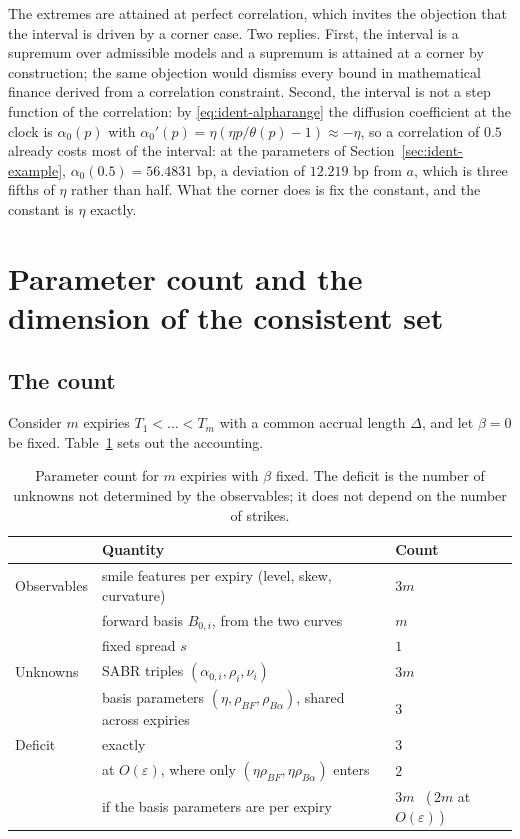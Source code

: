 \documentclass[../../../main.tex]{subfiles}
\begin{document}
\begin{remark}[Why $\rho_{BF}=\pm1$ is not a pathology]\label{rem:ident-extreme}
The extremes are attained at perfect correlation, which invites the objection that the interval is driven by a corner case. Two replies. First, the interval is a supremum over admissible models and a supremum is attained at a corner by construction; the same objection would dismiss every bound in mathematical finance derived from a correlation constraint. Second, the interval is not a step function of the correlation: by \eqref{eq:ident-alpharange} the diffusion coefficient at the clock is $\alpha_0(p)$ with $\alpha_0'(p)=\eta(\eta p/\theta(p)-1)\approx-\eta$, so a correlation of $0.5$ already costs most of the interval: at the parameters of Section~\ref{sec:ident-example}, $\alpha_0(0.5)=56.4831$ bp, a deviation of $12.219$ bp from $a$, which is three fifths of $\eta$ rather than half. What the corner does is fix the constant, and the constant is $\eta$ exactly.
\end{remark}

\section{Parameter count and the dimension of the consistent set}\label{sec:ident-count}

\subsection{The count}

Consider $m$ expiries $T_1<\dots<T_m$ with a common accrual length $\Delta$, and let $\beta=0$ be fixed. Table~\ref{tab:ident-count} sets out the accounting.

\begin{table}[htbp]
\centering
\caption{Parameter count for $m$ expiries with $\beta$ fixed. The deficit is the number of unknowns not determined by the observables; it does not depend on the number of strikes.}\label{tab:ident-count}
\begin{tabular}{@{}lll@{}}
\toprule
& Quantity & Count \\
\midrule
Observables & smile features per expiry (level, skew, curvature) & $3m$ \\
& forward basis $B_{0,i}$, from the two curves & $m$ \\
& fixed spread $s$ & $1$ \\
\midrule
Unknowns & SABR triples $(\alpha_{0,i},\rho_i,\nu_i)$ & $3m$ \\
& basis parameters $(\eta,\rho_{BF},\rho_{B\alpha})$, shared across expiries & $3$ \\
\midrule
Deficit & exactly & $3$ \\
& at $O(\varepsilon)$, where only $(\eta\rho_{BF},\eta\rho_{B\alpha})$ enters & $2$ \\
& if the basis parameters are per expiry & $3m$ \ (\,$2m$ at $O(\varepsilon)$\,) \\
\bottomrule
\end{tabular}
\end{table}
\end{document}
